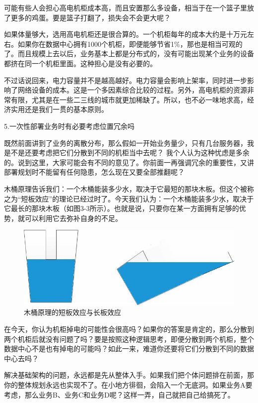 \documentclass[12pt,UTF8]{ctexbook}
\begin{document}
可能有些人会担心高电机柜成本高，而且安置那么多设备，相当于在一个篮子里放了更多的鸡蛋。要是篮子打翻了，损失会不会更大呢？

如果体量够大，选用高电机柜还是很合算的。一个机柜每年的成本大约是十万元左右。如果你在数据中心拥有1000个机柜，即便能够节省1\%，那也是相当可观的了。而且规模上去以后，业务基本上都是分布式的，没有可能出现某个业务的设备都挤在同一个机柜里面。这种担心是没有必要的。

不过话说回来，电力容量并不是越高越好。电力容量会影响上架率，同时进一步影响了网络设备的成本。这是一个多因素综合比较的过程。另外，高电机柜的资源非常有限，尤其是在一些二三线的城市就更加稀缺了。所以，也不必一味地求高，经济实用还是我们一贯的基本原则。

5.一次性部署业务时有必要考虑位置冗余吗

既然前面讲到了业务的离散分布，那么假如一开始业务量少，只有几台服务器，我是不是还要考虑把它们分散到不同的机柜当中去呢？
我个人认为这种忧虑是多余的。说到这里，大家可能会有不同的意见了。你前面一再强调冗余的重要性，又讲部署规划时不能留有任何隐患，怎么现在又要全部推翻呢？

木桶原理告诉我们：一个木桶能装多少水，取决于它最短的那块木板。但这个被称之为“短板效应”的理论已经过时了。今天我们认为：一个木桶能装多少水，取决于它最长的那块木板（如图3-3所示）。也就是说，只要你在某一方面拥有足够的优势，就可以利用它去弥补自身的不足。

\begin{figure}[htbp]
	\centering
	\includegraphics[width=1\linewidth]{7}
	\caption{木桶原理的短板效应与长板效应}
	\label{fig:1}
\end{figure}

在今天，你认为机柜掉电的可能性会很高吗？如果你的答案是肯定的，那么分散到两个机柜后就没有问题了吗？要是按照这种逻辑思考，即便分散到两个机柜，整个数据中心不是也有掉电的可能吗？如此一来，难道你还要将它们分散到不同的数据中心去吗？

解决基础架构的问题，永远都是先从整体入手。如果我们把个体问题排在前面，那你的整体规划永远也实现不了。在小地方徘徊，会陷入一个无底洞。如果业务A要考虑，那么业务B、业务C和业务D呢？这样一弄，自己就把自己给搞死了。
\end{document}
